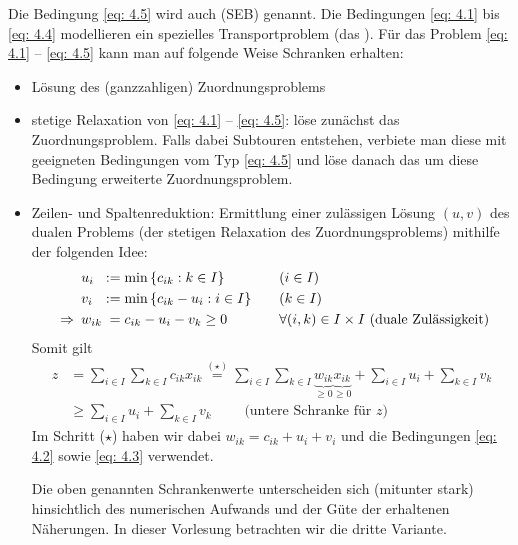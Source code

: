Die Bedingung \eqref{eq: 4.5} wird auch  (SEB) genannt.
Die Bedingungen \eqref{eq: 4.1} bis \eqref{eq: 4.4} modellieren ein spezielles Transportproblem (das ).
Für das Problem \eqref{eq: 4.1} -- \eqref{eq: 4.5} kann man auf folgende Weise Schranken erhalten:
\begin{itemize}
	\item Lösung des (ganzzahligen) Zuordnungsproblems
	\item stetige Relaxation von \eqref{eq: 4.1} -- \eqref{eq: 4.5}: löse zunächst das Zuordnungsproblem. Falls dabei Subtouren entstehen, verbiete man diese mit geeigneten Bedingungen vom Typ \eqref{eq: 4.5} und löse danach das um diese Bedingung erweiterte Zuordnungsproblem.
	\item Zeilen- und Spaltenreduktion: Ermittlung einer zulässigen Lösung $(u,v)$ des dualen Problems (der stetigen Relaxation des Zuordnungsproblems) mithilfe der folgenden Idee:
	\begin{equation*}
		\begin{alignedat}{3}
			&u_i &&\mathrel{:=} \min\left\{ c_{ik} : k \in I \right\} \qquad &&(i \in I) \\
			&v_i &&\mathrel{:=} \min\left\{ c_{ik} - u_i : i \in I \right\} \qquad &&(k \in I) \\
			\enskip \Rightarrow \enskip &w_{ik} &&\phantom{:}= c_{ik} - u_i - v_k \ge 0 \qquad &&\forall (i,k) \in I \times I \text{ (duale Zulässigkeit)}
		\end{alignedat}
	\end{equation*}
	Somit gilt
	\begin{equation*}
		\begin{aligned}
			z &= \sum_{i \in I} \sum_{k \in I} c_{ik} x_{ik} 
			\overset{(\star)}{=} \sum_{i \in I} \sum_{k \in I} \underbrace{w_{ik}}_{\ge 0} \underbrace{x_{ik}}_{\ge 0} + \sum_{i \in I} u_i + \sum_{k \in I} v_k \\
			&\ge \sum_{i \in I} u_i + \sum_{k \in I} v_k \qquad \text{ (untere Schranke für $z$) }
		\end{aligned}
	\end{equation*}
	Im Schritt ($\star$) haben wir dabei $w_{ik} = c_{ik} + u_i + v_i$ und die Bedingungen \eqref{eq: 4.2} sowie \eqref{eq: 4.3} verwendet.
	
	Die oben genannten Schrankenwerte unterscheiden sich (mitunter stark) hinsichtlich des numerischen Aufwands und der Güte der erhaltenen Näherungen. In dieser Vorlesung betrachten wir die dritte Variante.
\end{itemize}

